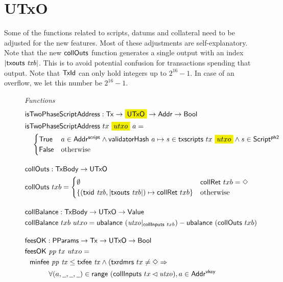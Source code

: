 \section{UTxO}
\label{sec:utxo}

Some of the functions related to scripts, datums and collateral need
to be adjusted for the new features. Most of these adjustments are
self-explanatory. Note that the new $\mathsf{collOuts}$ function
generates a single output with an index $| \mathsf{txouts}~ \mathit{txb} |$. This is to
avoid potential confusion for transactions spending that output. Note
that $\mathsf{TxId}$ can only hold integers up to $2^{16} - 1$. In case of an
overflow, we let this number be $2^{16} - 1$.

\begin{figure*}[htb]
  \emph{Functions}
  \begin{align*}
    & \fun{isTwoPhaseScriptAddress} : \Tx \to \hldiff{\UTxO} \to \Addr \to \Bool \\
    & \fun{isTwoPhaseScriptAddress}~tx~\hldiff{utxo}~a = \\
    &\quad\begin{cases}
        \True  & a \in \AddrScr \land \fun{validatorHash}~a \mapsto s \in \fun{txscripts}~tx~\hldiff{utxo} \land s \in \ScriptPhTwo \\
        \False & \text{otherwise}
      \end{cases}
    \nextdef
    & \fun{collOuts} : \TxBody \to \UTxO \\
    & \fun{collOuts}~txb =
      \begin{cases}
        \emptyset                                                      & \fun{collRet}~txb = \Nothing \\
        \{ (\txid{txb}, | \txouts{txb} |) \mapsto \fun{collRet}~txb \} & \text{otherwise}
      \end{cases}
    \nextdef
    & \fun{collBalance} : \TxBody \to \UTxO \to \Value \\
    & \fun{collBalance}~txb~utxo = \fun{ubalance}~(\var{utxo}|_{\fun{collInputs}~{txb}}) - \fun{ubalance}~(\fun{collOuts}~txb)
    \nextdef
    & \fun{feesOK} : \PParams \to \Tx \to \UTxO \to \Bool  \\
    & \fun{feesOK}~\var{pp}~tx~utxo = \\
    &~~      \minfee{pp}{tx} \leq \txfee{tx} \wedge (\fun{txrdmrs}~tx \neq \Nothing \Rightarrow \\
    &~~~~~~~~~~\forall (a, \wcard, \wcard, \wcard) \in \fun{range}~(\fun{collInputs}~tx \restrictdom \var{utxo}), a \in \AddrVKey \\

\end{align*}
\end{figure*}
